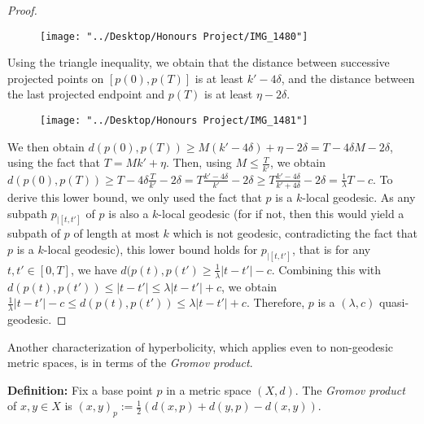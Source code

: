 \documentclass[12pt]{article}
\newcommand{\vs}{\vskip10pt}
\begin{document}
\begin{proof}
		\vs
		
		
\begin{figure} [h]
	\centering
	\texttt{[image: "../Desktop/Honours Project/IMG\_1480"]}
	\caption{}
	\label{fig:img1480}
\end{figure}
		
		Using the triangle inequality, we obtain that the distance between successive projected points on $[p(0), p(T)]$ is at least $k' - 4 \delta$, and the distance between the last projected endpoint and $p(T)$ is at least $\eta - 2 \delta$. 
		
		
\begin{figure} [h]
	\centering
	\texttt{[image: "../Desktop/Honours Project/IMG\_1481"]}
	\caption{}
	\label{fig:img1481}
\end{figure}
		
		 We then obtain $d(p(0), p(T)) \geq M(k' - 4 \delta) + \eta - 2 \delta = T - 4 \delta M - 2 \delta$, using the fact that $T = Mk' + \eta$. Then, using $M \leq \frac{T}{k'}$, we obtain $d(p(0), p(T)) \geq T - 4 \delta \frac{T}{k'} - 2 \delta = T \frac{k' - 4 \delta}{k'} - 2 \delta \geq T \frac{k' - 4 \delta}{k' + 4 \delta} - 2 \delta = \frac{1}{\lambda} T - c$. To derive this lower bound, we only used the fact that $p$ is a $k$-local geodesic. As any subpath $p_{\vert [t, t']}$ of $p$ is also a $k$-local geodesic (for if not, then this would yield a subpath of $p$ of length at most $k$ which is not geodesic, contradicting the fact that $p$ is a $k$-local geodesic), this lower bound holds for $p_{\vert [t, t']}$, that is for any $t,t' \in [0, T]$, we have $d(p(t), p(t') \geq \frac{1}{\lambda} \vert t - t' \vert - c$. Combining this with $d(p(t), p(t')) \leq \vert t - t' \vert \leq \lambda \vert t - t' \vert + c$, we obtain $ \frac{1}{\lambda} \vert t - t' \vert - c \leq d(p(t), p(t')) \leq \lambda \vert t - t' \vert + c$. Therefore, $p$ is a $(\lambda, c)$ quasi-geodesic. 
				
	\end{proof}


	
	\vs 
	
	Another characterization of hyperbolicity, which applies even to non-geodesic metric spaces, is in terms of the \textit{Gromov product}. 
	
	\vs 
	
	\textbf{Definition: } Fix a base point $p$ in a metric space $(X,d)$. The \textit{Gromov product} of $x,y \in X$ is $(x,y)_p := \frac{1}{2} (d(x,p) + d(y,p) - d(x,y))$. 
	
\end{document}
